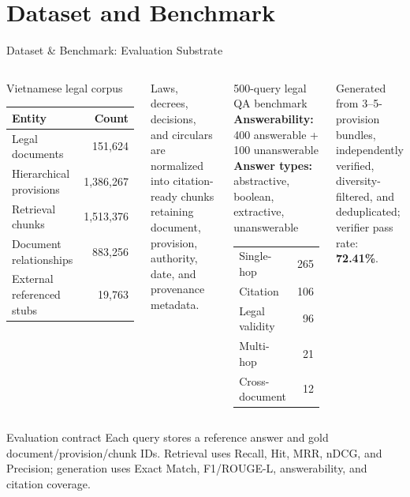 \section{Dataset and Benchmark}

\begin{frame}{Dataset \& Benchmark: Evaluation Substrate}
\scriptsize
\begin{columns}[T,onlytextwidth]
    \begin{block}{Vietnamese legal corpus}
      \centering
      \begin{tabular}{lr}
        \toprule
        \textbf{Entity} & \textbf{Count} \\
        \midrule
        Legal documents & 151,624 \\
        Hierarchical provisions & 1,386,267 \\
        Retrieval chunks & 1,513,376 \\
        Document relationships & 883,256 \\
        External referenced stubs & 19,763 \\
        \bottomrule
      \end{tabular}
    \end{block}
    \vspace{0.08cm}
    Laws, decrees, decisions, and circulars are normalized into citation-ready chunks retaining document, provision, authority, date, and provenance metadata.

    \begin{block}{500-query legal QA benchmark}
      \textbf{Answerability:} 400 answerable + 100 unanswerable\\[0.05cm]
      \textbf{Answer types:} abstractive, boolean, extractive, unanswerable\\[0.05cm]
      \begin{tabular}{lr}
        Single-hop & 265 \\
        Citation & 106 \\
        Legal validity & 96 \\
        Multi-hop & 21 \\
        Cross-document & 12
      \end{tabular}
    \end{block}
    \vspace{0.08cm}
    Generated from 3--5-provision bundles, independently verified, diversity-filtered, and deduplicated; verifier pass rate: \textbf{72.41\%}.
\end{columns}

\vspace{-0.02cm}
\begin{block}{Evaluation contract}
Each query stores a reference answer and gold document/provision/chunk IDs. Retrieval uses Recall, Hit, MRR, nDCG, and Precision; generation uses Exact Match, F1/ROUGE-L, answerability, and citation coverage.
\end{block}
\end{frame}

